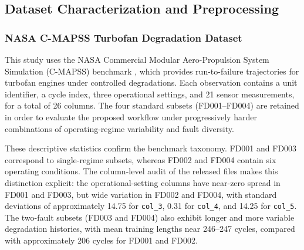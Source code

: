 \subsection{Dataset Characterization and Preprocessing}

\subsubsection{NASA C-MAPSS Turbofan Degradation Dataset}
This study uses the NASA Commercial Modular Aero-Propulsion System Simulation (C-MAPSS) benchmark \cite{Saxena2008}, which provides run-to-failure trajectories for turbofan engines under controlled degradations. Each observation contains a unit identifier, a cycle index, three operational settings, and 21 sensor measurements, for a total of 26 columns. The four standard subsets (FD001--FD004) are retained in order to evaluate the proposed workflow under progressively harder combinations of operating-regime variability and fault diversity.

\begin{table}[h]
    \centering
    \caption{Empirical summary of the C-MAPSS subsets used in this study. Train/test engine counts follow the released files; for FD004 the bundled readme swaps the counts, but the actual files contain 249 training engines and 248 test engines.}
    \label{tab:dataset_stats}
\end{table}

These descriptive statistics confirm the benchmark taxonomy. FD001 and FD003 correspond to single-regime subsets, whereas FD002 and FD004 contain six operating conditions. The column-level audit of the released files makes this distinction explicit: the operational-setting columns have near-zero spread in FD001 and FD003, but wide variation in FD002 and FD004, with standard deviations of approximately 14.75 for \texttt{col\_3}, 0.31 for \texttt{col\_4}, and 14.25 for \texttt{col\_5}. The two-fault subsets (FD003 and FD004) also exhibit longer and more variable degradation histories, with mean training lengths near 246--247 cycles, compared with approximately 206 cycles for FD001 and FD002.

